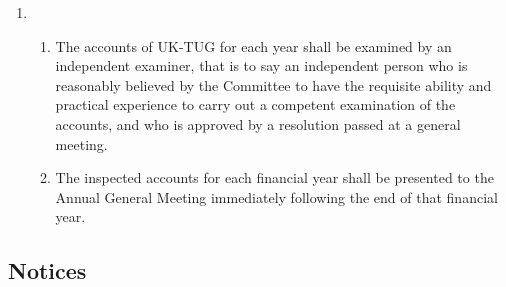 \documentclass[a4paper,11pt]{article}
\begin{document}
\begin{enumerate}
\item 
  \begin{enumerate}
  \item The accounts of UK-TUG for each year shall be examined by an
    independent examiner, that is to say an independent person who is
    reasonably believed by the Committee to have the requisite ability and
    practical experience to carry out a competent examination of the accounts,
    and who is approved by a resolution passed at a general
    meeting.

  \item The inspected accounts for each financial year shall be presented to the
    Annual General Meeting immediately following the end of that financial
    year.
  \end{enumerate}
\end{enumerate}

\subsection{Notices}
\label{Notices}
\end{document}

